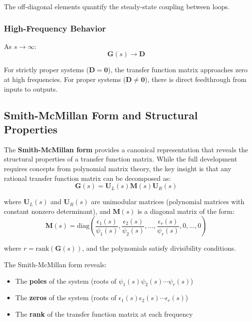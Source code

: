 The off-diagonal elements quantify the steady-state coupling between loops.

\subsubsection{High-Frequency Behavior}

As $s \to \infty$:
\begin{equation}
\mathbf{G}(s) \to \mathbf{D}
\end{equation}

For strictly proper systems ($\mathbf{D} = \mathbf{0}$), the transfer function matrix approaches zero at high frequencies. For proper systems ($\mathbf{D} \neq \mathbf{0}$), there is direct feedthrough from inputs to outputs.

\subsection{Smith-McMillan Form and Structural Properties}

The \textbf{Smith-McMillan form} provides a canonical representation that reveals the structural properties of a transfer function matrix. While the full development requires concepts from polynomial matrix theory, the key insight is that any rational transfer function matrix can be decomposed as:
\begin{equation}
\mathbf{G}(s) = \mathbf{U}_L(s) \mathbf{M}(s) \mathbf{U}_R(s)
\end{equation}

where $\mathbf{U}_L(s)$ and $\mathbf{U}_R(s)$ are unimodular matrices (polynomial matrices with constant nonzero determinant), and $\mathbf{M}(s)$ is a diagonal matrix of the form:
\begin{equation}
\mathbf{M}(s) = \text{diag}\left(\frac{\epsilon_1(s)}{\psi_1(s)}, \frac{\epsilon_2(s)}{\psi_2(s)}, \ldots, \frac{\epsilon_r(s)}{\psi_r(s)}, 0, \ldots, 0\right)
\end{equation}

where $r = \text{rank}(\mathbf{G}(s))$, and the polynomials satisfy divisibility conditions.

The Smith-McMillan form reveals:
\begin{itemize}
\item The \textbf{poles} of the system (roots of $\psi_1(s)\psi_2(s)\cdots\psi_r(s)$)
\item The \textbf{zeros} of the system (roots of $\epsilon_1(s)\epsilon_2(s)\cdots\epsilon_r(s)$)
\item The \textbf{rank} of the transfer function matrix at each frequency
\end{itemize}



